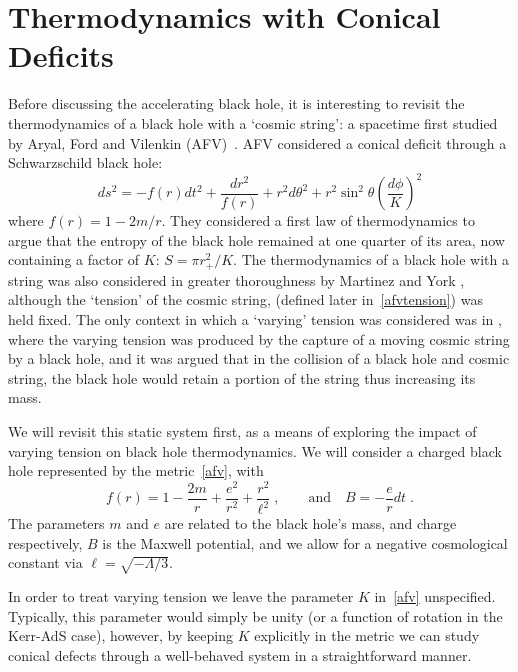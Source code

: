 \documentclass[
twoside,
openright,
frontopenright
]{dmathesis}
\begin{document}
\section{Thermodynamics with Conical Deficits}\label{sec:singlemu}

Before discussing the accelerating black hole, it is interesting to revisit the
thermodynamics of a black hole with a `cosmic string': a spacetime first studied
by Aryal, Ford and Vilenkin (AFV)~\cite{Aryal:1986sz}. AFV considered a conical
deficit through a Schwarzschild black hole:
\begin{equation}
ds^2 = - f(r) dt^2 + \frac{dr^2}{f(r)} + r^2 d\theta^2
+ r^2 \sin^2\theta \left (\frac{d\phi}{K}\right ) ^2
\label{afv}
\end{equation}
where $f(r) = 1 -2m/r$. They considered a first law of thermodynamics to argue
that the entropy of the black hole remained at one quarter of its area, now
containing a factor of $K$: $S = \pi r_+^2/K$. The thermodynamics of a black
hole with a string was also considered in greater thoroughness by Martinez and
York \cite{Martinez:1990sd}, although the `tension' of the cosmic string,
(defined later in~\eqref{afvtension}) was held fixed. The only context in which
a `varying' tension was considered was in \cite{Bonjour:1998rf}, where the
varying tension was produced by the capture of a moving cosmic string by a black
hole, and it was argued that in the collision of a black hole and cosmic string,
the black hole would retain a portion of the string thus increasing its mass.

We will revisit this static system first, as a means of exploring the impact of
varying tension on black hole thermodynamics. We will consider
a charged black hole represented by the metric~\eqref{afv}, with
\begin{equation}
f(r) = 1-\frac{2m}{r} + \frac{e^{2}}{r^{2}} + \frac{r^{2}}{\ell^2}\;, \qquad
\text{and} \quad {B} = - \frac{e}{r} dt\;.
\end{equation}
The parameters $m$ and $e$ are related to the black hole's mass, 
and charge respectively, $B$ is the Maxwell potential, and we allow 
for a negative cosmological constant via $\ell = \sqrt{-\Lambda/3}$.

In order to treat varying tension we leave the parameter $K$ in~\eqref{afv}
unspecified.  Typically, this parameter would simply be unity (or a function of
rotation in the Kerr-AdS case), however, by keeping $K$ explicitly in the metric
we can study conical defects through a well-behaved system in a straightforward
manner.
\end{document}
